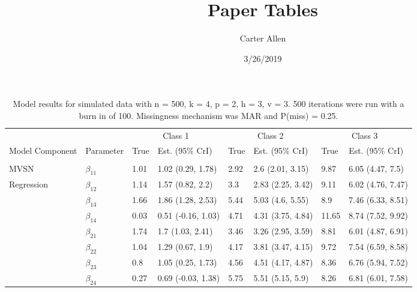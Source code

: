 \documentclass[]{article}
\title{Paper Tables}
\author{Carter Allen}
\date{3/26/2019}
\begin{document}
\maketitle

\begin{table}[t]

\caption{\label{tab:unnamed-chunk-4}Model results for simulated data with n = 500, k = 4, p = 2, h = 3, v = 3. 500 iterations were run with a burn in of 100. Missingness mechanism was MAR and P(miss) = 0.25.}
\centering
\fontsize{8}{10}\selectfont
\begin{tabular}{llllllll}
\toprule
\multicolumn{2}{c}{ } & \multicolumn{2}{c}{Class 1} & \multicolumn{2}{c}{Class 2} & \multicolumn{2}{c}{Class 3} \\
\cmidrule(l{3pt}r{3pt}){3-4} \cmidrule(l{3pt}r{3pt}){5-6} \cmidrule(l{3pt}r{3pt}){7-8}
Model Component & Parameter & True & Est. (95\% CrI) & True & Est. (95\% CrI) & True & Est. (95\% CrI)\\
\midrule
\addlinespace[0.3em]
\multicolumn{8}{l}{\textbf{ }}\\
\hspace{1em}MVSN & $\beta_{11}$ & 1.01 & 1.02 (0.29, 1.78) & 2.92 & 2.6 (2.01, 3.15) & 9.87 & 6.05 (4.47, 7.5)\\
\hspace{1em}Regression & $\beta_{12}$ & 1.14 & 1.57 (0.82, 2.2) & 3.3 & 2.83 (2.25, 3.42) & 9.11 & 6.02 (4.76, 7.47)\\
\hspace{1em} & $\beta_{13}$ & 1.66 & 1.86 (1.28, 2.53) & 5.44 & 5.03 (4.6, 5.55) & 8.9 & 7.46 (6.33, 8.51)\\
\hspace{1em} & $\beta_{14}$ & 0.03 & 0.51 (-0.16, 1.03) & 4.71 & 4.31 (3.75, 4.84) & 11.65 & 8.74 (7.52, 9.92)\\
\hspace{1em} & $\beta_{21}$ & 1.74 & 1.7 (1.03, 2.41) & 3.46 & 3.26 (2.95, 3.59) & 8.81 & 6.01 (4.87, 6.91)\\
\hspace{1em} & $\beta_{22}$ & 1.04 & 1.29 (0.67, 1.9) & 4.17 & 3.81 (3.47, 4.15) & 9.72 & 7.54 (6.59, 8.58)\\
\hspace{1em} & $\beta_{23}$ & 0.8 & 1.05 (0.25, 1.73) & 4.56 & 4.51 (4.17, 4.87) & 8.36 & 6.76 (5.94, 7.52)\\
\hspace{1em} & $\beta_{24}$ & 0.27 & 0.69 (-0.03, 1.38) & 5.75 & 5.51 (5.15, 5.9) & 8.26 & 6.81 (6.01, 7.58)\\

\end{tabular}
\end{table}
\end{document}
